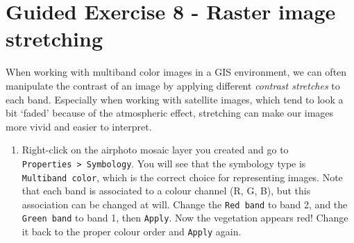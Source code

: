 \documentclass[
  letterpaper,
  DIV=11,
  numbers=noendperiod]{scrreprt}
\providecommand{\tightlist}{%
  \setlength{\itemsep}{0pt}\setlength{\parskip}{0pt}}\usepackage{longtable,booktabs,array}
\begin{document}
\section{Guided Exercise 8 - Raster image
stretching}\label{guided-exercise-8---raster-image-stretching}

When working with multiband color images in a GIS environment, we can
often manipulate the contrast of an image by applying different
\emph{contrast stretches} to each band. Especially when working with
satellite images, which tend to look a bit `faded' because of the
atmospheric effect, stretching can make our images more vivid and easier
to interpret.

\begin{enumerate}
\def\labelenumi{(\arabic{enumi})}
\setcounter{enumi}{181}
\tightlist
\item
  Right-click on the airphoto mosaic layer you created and go to
  \texttt{Properties\ \textgreater{}\ Symbology}. You will see that the
  symbology type is \texttt{Multiband\ color}, which is the correct
  choice for representing images. Note that each band is associated to a
  colour channel (R, G, B), but this association can be changed at will.
  Change the \texttt{Red\ band} to band 2, and the \texttt{Green\ band}
  to band 1, then \texttt{Apply}. Now the vegetation appears red! Change
  it back to the proper colour order and \texttt{Apply} again.
\end{enumerate}
\end{document}
